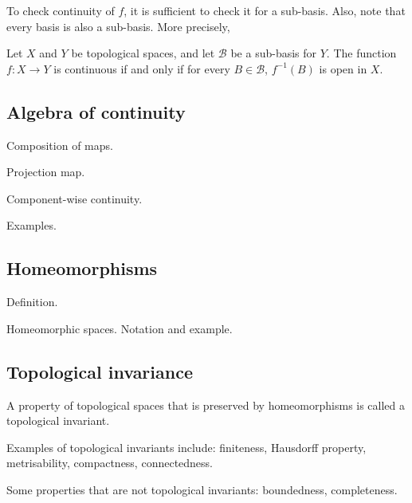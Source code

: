 To check continuity of $f$, it is sufficient to check it for a sub-basis. Also, note that every basis is also a sub-basis. More precisely,
\begin{nlemma}
  Let $X$ and $Y$ be topological spaces, and let $\mathcal{B}$ be a sub-basis for $Y$. The function $f: X \to Y$ is continuous if and only if for every $B \in \mathcal{B}$, $f^{-1}(B)$ is open in $X$.
\end{nlemma}

\subsection{Algebra of continuity}
Composition of maps.

Projection map.

Component-wise continuity.

Examples.

\subsection{Homeomorphisms}
Definition.

Homeomorphic spaces. Notation and example.



\subsection{Topological invariance}
\begin{ndfn}
  A property of topological spaces that is preserved by homeomorphisms is called a topological invariant.
\end{ndfn}

Examples of topological invariants include: finiteness, Hausdorff property, metrisability, compactness, connectedness.

Some properties that are not topological invariants: boundedness, completeness.
